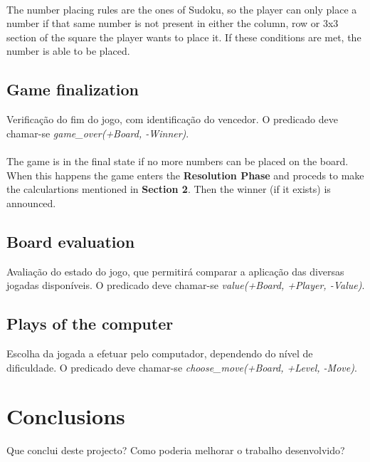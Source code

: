 \documentclass[a4paper]{article}
\begin{document}
\paragraph{}
The number placing rules are the ones of Sudoku, so the player can only place a number if that same number is not present
in either the column, row or 3x3 section of the square the player wants to place it. If these conditions are met, 
the number is able to be placed.

\subsection{Game finalization} 
Verificação do fim do jogo, com identificação do vencedor. O predicado deve chamar-se \textit{game\_over(+Board, -Winner)}.

\paragraph{}
The game is in the final state if no more numbers can be placed on the board. When this happens the game enters the 
\textbf{Resolution Phase} and proceds to make the calculartions mentioned in \textbf{Section 2}. Then the winner (if it exists) is
announced. 

\subsection{Board evaluation}
Avaliação do estado do jogo, que permitirá comparar a aplicação das diversas jogadas disponíveis. O predicado deve chamar-se \textit{value(+Board, +Player, -Value)}.

\subsection{Plays of the computer} 
Escolha da jogada a efetuar pelo computador, dependendo do nível de dificuldade. O predicado deve chamar-se \textit{choose\_move(+Board, +Level, -Move)}.



\pagebreak
\section{Conclusions}
Que conclui deste projecto? Como poderia melhorar o trabalho desenvolvido?


\clearpage
\renewcommand\refname{Apendix}



\newpage
\appendix
\end{document}
